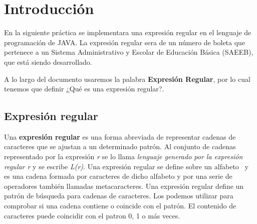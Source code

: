\documentclass[12pt]{article}
\begin{document}

	\section{Introducción}
	En la siguiente práctica se implementara una expresión regular en el lenguaje de programación de JAVA.
	La expresión regular sera de un número de boleta que pertenece a un Sistema Administrativo y Escolar 
	de Educación Básica (SAEEB), que está siendo desarrollado.

	A lo largo del documento usaremos la palabra \textbf{Expresión Regular}, por lo cual tenemos que definir
	¿Qué es una expresión regular?.

	\subsection{Expresión regular}
	
	Una \textbf{expresión regular} es una forma abreviada de representar cadenas de caracteres que se ajustan
	a un determinado patrón. Al conjunto de cadenas representado por la expresión \textsl{r} se lo llama 
	\textsl{lenguaje generado por la expresión regular r}  y se escribe \textsl{L(r)}. Una expresión regular 
	se define sobre un alfabeto \ y es una cadena formada por caracteres de dicho alfabeto y por una serie de
	operadores también llamadas metacaracteres.
	Una expresión regular define un patrón de búsqueda para cadenas de caracteres. Los podemos utilizar 	
	para comprobar si una cadena contiene o coincide con el patrón. El
	contenido de caracteres puede
	coincidir con el patron 0, 1 o más veces.
\end{document}
